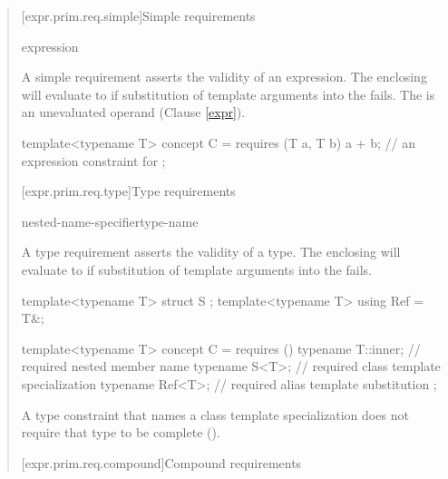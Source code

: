 \begin{quote}
\begin{addedblock}
[expr.prim.req.simple]{Simple requirements}

\begin{bnf}
\br
    expression \terminal{;}
\end{bnf}

\pnum
A simple requirement asserts the validity of an expression.
\enternote
The enclosing  will evaluate to 
if substitution of template arguments into the  fails.
The  is an unevaluated operand (Clause \ref{expr}).
\exitnote

\enterexample
\begin{codeblock}
template<typename T> concept C =
  requires (T a, T b) {
    a + b;  // an expression constraint for 
  };
\end{codeblock}
\exitexample


[expr.prim.req.type]{Type requirements}

\begin{bnf}
\br
     nested-name-specifier\opt type-name \terminal{;}
\end{bnf}

\pnum
A type requirement asserts the validity of a type.
\enternote
The enclosing  will evaluate to 
if substitution of template arguments into the  fails.
\exitnote
\enterexample
\begin{codeblock}
template<typename T> struct S { };
template<typename T> using Ref = T&;

template<typename T> concept C =
  requires () {
    typename T::inner; // required nested member name
    typename S<T>;     // required class template specialization
    typename Ref<T>;   // required alias template substitution
  };
\end{codeblock}
\exitexample

\pnum
A type constraint that names a class template specialization 
does not require that type to be complete 
().


[expr.prim.req.compound]{Compound requirements}
      

\end{addedblock}
\end{quote}
